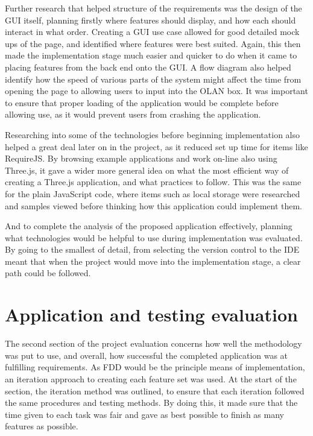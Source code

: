 Further research that helped structure of the requirements was the design of the GUI itself, planning firstly where features should display, and how each should interact in what order. Creating a GUI use case allowed for good detailed mock ups of the page, and identified where features were best suited. Again, this then made the implementation stage much easier and quicker to do when it came to placing features from the back end onto the GUI. A flow diagram also helped identify how the speed of various parts of the system might affect the time from opening the page to allowing users to input into the OLAN box. It was important to ensure that proper loading of the application would be complete before allowing use, as it would prevent users from crashing the application.

Researching into some of the technologies before beginning implementation also helped a great deal later on in the project, as it reduced set up time for items like RequireJS. By browsing example applications and work on-line also using Three.js, it gave a wider more general idea on what the most efficient way of creating a Three.js application, and what practices to follow. This was the same for the plain JavaScript code, where items such as local storage were researched and samples viewed before thinking how this application could implement them.

And to complete the analysis of the proposed application effectively, planning what technologies would be helpful to use during implementation was evaluated. By going to the smallest of detail, from selecting the version control to the IDE meant that when the project would move into the implementation stage, a clear path could be followed.

\section{Application and testing evaluation}
The second section of the project evaluation concerns how well the methodology was put to use, and overall, how successful the completed application was at fulfilling requirements. As FDD would be the principle means of implementation, an iteration approach to creating each feature set was used. At the start of the section, the iteration method was outlined, to ensure that each iteration followed the same procedures and testing methods. By doing this, it made sure that the time given to each task was fair and gave as best possible to finish as many features as possible.

